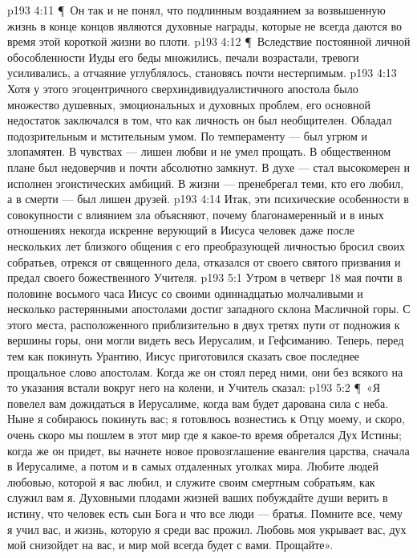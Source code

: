\vs p193 4:11 \P\ \bibnobreakspace Он так и не понял, что подлинным воздаянием за возвышенную жизнь в конце концов являются духовные награды, которые не всегда даются во время этой короткой жизни во плоти.
\vs p193 4:12 \P\ Вследствие постоянной личной обособленности Иуды его беды множились, печали возрастали, тревоги усиливались, а отчаяние углублялось, становясь почти нестерпимым.
\vs p193 4:13 Хотя у этого эгоцентричного сверхиндивидуалистичного апостола было множество душевных, эмоциональных и духовных проблем, его основной недостаток заключался в том, что как личность он был необщителен. Обладал подозрительным и мстительным умом. По темпераменту --- был угрюм и злопамятен. В чувствах --- лишен любви и не умел прощать. В общественном плане был недоверчив и почти абсолютно замкнут. В духе --- стал высокомерен и исполнен эгоистических амбиций. В жизни --- пренебрегал теми, кто его любил, а в смерти --- был лишен друзей.
\vs p193 4:14 Итак, эти психические особенности в совокупности с влиянием зла объясняют, почему благонамеренный и в иных отношениях некогда искренне верующий в Иисуса человек даже после нескольких лет близкого общения с его преобразующей личностью бросил своих собратьев, отрекся от священного дела, отказался от своего святого призвания и предал своего божественного Учителя.
\vs p193 5:1 Утром в четверг 18 мая почти в половине восьмого часа Иисус со своими одиннадцатью молчаливыми и несколько растерянными апостолами достиг западного склона Масличной горы. С этого места, расположенного приблизительно в двух третях пути от подножия к вершины горы, они могли видеть весь Иерусалим, и Гефсиманию. Теперь, перед тем как покинуть Урантию, Иисус приготовился сказать свое последнее прощальное слово апостолам. Когда же он стоял перед ними, они без всякого на то указания встали вокруг него на колени, и Учитель сказал:
\vs p193 5:2 \P\ «Я повелел вам дожидаться в Иерусалиме, когда вам будет дарована сила с неба. Ныне я собираюсь покинуть вас; я готовлюсь вознестись к Отцу моему, и скоро, очень скоро мы пошлем в этот мир где я какое\hyp{}то время обретался Дух Истины; когда же он придет, вы начнете новое провозглашение евангелия царства, сначала в Иерусалиме, а потом и в самых отдаленных уголках мира. Любите людей любовью, которой я вас любил, и служите своим смертным собратьям, как служил вам я. Духовными плодами жизней ваших побуждайте души верить в истину, что человек есть сын Бога и что все люди --- братья. Помните все, чему я учил вас, и жизнь, которую я среди вас прожил. Любовь моя укрывает вас, дух мой снизойдет на вас, и мир мой всегда будет с вами. Прощайте».

